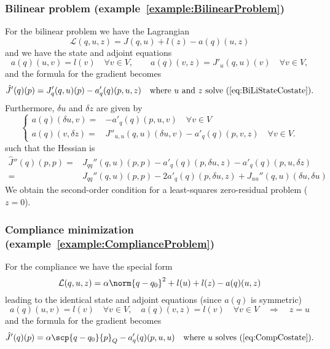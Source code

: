 %
\subsubsection{Bilinear problem (example~\ref{example:BilinearProblem})}
%
For the bilinear problem we have the Lagrangian
%
\begin{equation}\label{eq:BiliLagrangian}
\mathcal L(q,u,z) = J(q,u) + l(z) - a(q)(u,z)
\end{equation}
%
and we have the state and adjoint equations
%
\begin{equation}\label{eq:BiLiStateCostate}
a(q)(u,v)  = l(v)\quad \forall v\in V,\qquad  a(q)(v,z)=J'_u(q,u)(v) \quad \forall v\in V,
\end{equation}
%
%
and the formula for the gradient becomes
%
\begin{equation}\label{eq:BiLiGrad}
\hat J'(q)(p) = J_q'(q,u)(p) - a'_q(q)(p,u,z)\quad \mbox{where $u$ and $z$ solve (\ref{eq:BiLiStateCostate}).}
\end{equation}
Furthermore, $\delta u$ and $\delta z$ are given by
%
\begin{equation}\label{eq:BiLiSecondStateCostate}
\left\{
%
\begin{aligned}
a(q)(\delta u, v)=& -a'_q(q)(p,u,v)\quad\forall v\in V\\
a(q)(v,\delta z)=& J''_{u,u}(q,u)(\delta u, v)-a'_q(q)(p,v,z)\quad\forall v\in V.
\end{aligned}
%
\right.
\end{equation}
%
such that the Hessian is
%
\begin{align*}
\hat J''(q)(p,p) =&J_{qq}''(q,u)(p,p) - a'_q(q)(p,\delta u, z) - a'_q(q)(p,u, \delta z)\\
=&J_{qq}''(q,u)(p,p) - 2a'_q(q)(p,\delta u, z) +  J_{uu}''(q,u)(\delta u,\delta u)
\end{align*}
%
We obtain the second-order condition for a least-squares zero-residual problem ($z=0$).
%
\subsubsection{Compliance minimization (example~\ref{example:ComplianceProblem})}
%
%
For the compliance we have the special form
%
\begin{equation}\label{eq:CompliLagrangian}
\mathcal L(q,u,z) = \alpha\norm{q-q_0}^2 + l(u) + l(z) - a(q)(u,z)
\end{equation}
%
leading to the identical state and adjoint equations (since $a(q)$ is symmetric)
%
\begin{equation}\label{eq:CompCostate}
a(q)(u,v)  = l(v)\quad \forall v\in V,\quad a(q)(v,z)=l(v) \quad \forall v\in V\quad\Rightarrow\quad z=u
\end{equation}
%
%
and the formula for the gradient becomes
%
\begin{equation}\label{eq:CompGrad}
\hat J'(q)(p) = \alpha\scp{q-q_0}{p}_Q-a'_q(q)(p,u,u)\quad \mbox{where $u$ solves (\ref{eq:CompCostate}).}
\end{equation}


